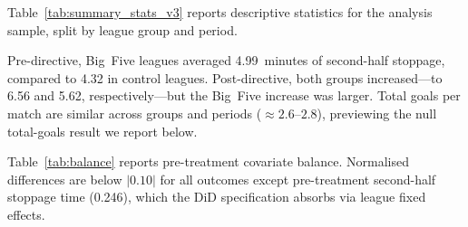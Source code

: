 Table~\ref{tab:summary_stats_v3} reports descriptive statistics for
the analysis sample, split by league group and period.



Pre-directive, Big~Five leagues averaged 4.99~minutes of second-half
stoppage, compared to 4.32 in control leagues. Post-directive, both
groups increased---to 6.56 and 5.62, respectively---but the
Big~Five increase was larger. Total goals per match are similar
across groups and periods ($\approx 2.6$--$2.8$), previewing the
null total-goals result we report below.

Table~\ref{tab:balance} reports pre-treatment covariate balance.
Normalised differences \citep{imbens2009recent} are below $|0.10|$
for all outcomes except pre-treatment second-half stoppage time
(0.246), which the DiD specification absorbs via league fixed
effects.



